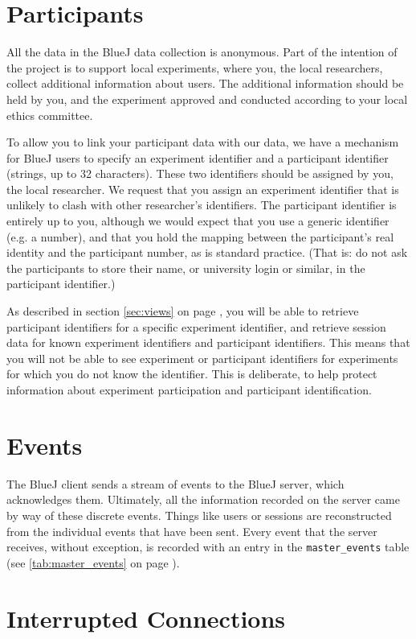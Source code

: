 \documentclass{report}
\newcommand{\myref}[1]{\autoref{#1} on page \pageref*{#1}}
\newcommand{\tabref}[1]{\lstinline|#1| table (see \myref{tab:#1})}
\begin{document}
\section{Participants}
\label{sec:participants}

All the data in the BlueJ data collection is anonymous.  Part of the intention
of the project is to support local experiments, where you, the local
researchers, collect additional information about users.  The additional
information should be held by you, and the experiment approved and conducted
according to your local ethics committee.

To allow you to link your participant data with our data, we have a mechanism
for BlueJ users to specify an experiment identifier and a participant
identifier (strings, up to 32 characters).  These two identifiers should be
assigned by you, the local researcher.  We request that you assign an
experiment identifier that is unlikely to clash with other researcher's
identifiers.  The participant identifier is entirely up to you, although we
would expect that you use a generic identifier (e.g. a number), and that you
hold the mapping between the participant's real identity and the participant
number, as is standard practice.  (That is: do not ask the participants to store their name, or
university login or similar, in the participant identifier.)

As described in section \myref{sec:views}, you will be able to retrieve
participant identifiers for a specific experiment identifier, and retrieve
session data for known experiment identifiers and participant identifiers.
This means that you will not be able to see experiment or participant
identifiers for experiments for which you do  not know the identifier.  This
is deliberate, to help protect information about experiment participation and
participant identification.

\section{Events}

The BlueJ client sends a stream of events to the BlueJ server, which
acknowledges them.  Ultimately, all the information recorded on the server
came by way of these discrete events.  Things like users or sessions are
reconstructed from the individual events that have been sent.  Every event
that the server receives, without exception, is recorded with an entry in the \tabref{master_events}.

\section{Interrupted Connections}
\label{def:interruption}
\end{document}
